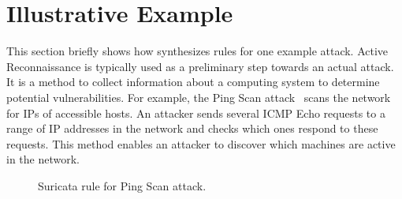\documentclass[conference]{IEEEtran}
\begin{document}





\section{Illustrative Example}
\label{sec:suri-metas-coverage}
\label{sec:active-recon}

This section briefly shows how \tname{} synthesizes rules for one
example attack. Active Reconnaissance is typically used as a
preliminary step towards an actual attack. It is a method to collect
information about a computing system to determine potential
vulnerabilities. For example, the Ping Scan attack~\cite{ping-scan}
scans the network for IPs of accessible hosts. An attacker sends
several ICMP Echo requests to a range of IP addresses in the network
and checks which ones respond to these requests. This method enables
an attacker to discover which machines are active in the network.


\begin{figure}[h!]
  
  \vspace{-1ex}  
  \caption{Suricata rule for Ping Scan attack.}
  \vspace{-2ex}  
  \label{fig:pingscan-example}
\end{figure}
\end{document}
